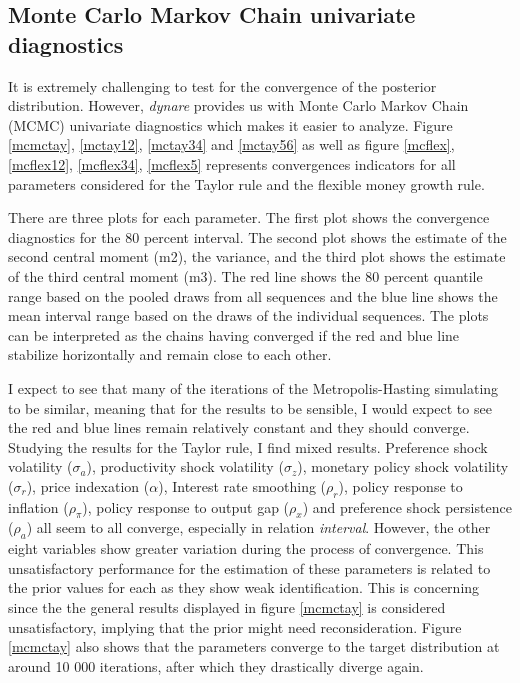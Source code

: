 \documentclass[11pt,preprint, authoryear]{elsarticle}
\numberwithin{equation}{section}
\numberwithin{figure}{section}
\numberwithin{table}{section}
\begin{document}
\hypertarget{monte-carlo-markov-chain-univariate-diagnostics}{%
\subsection{Monte Carlo Markov Chain univariate
diagnostics}\label{monte-carlo-markov-chain-univariate-diagnostics}}

It is extremely challenging to test for the convergence of the posterior
distribution. However, \emph{dynare} provides us with Monte Carlo Markov
Chain (MCMC) univariate diagnostics which makes it easier to analyze.
Figure \ref{mcmctay}, \ref{mctay12}, \ref{mctay34} and \ref{mctay56} as
well as figure \ref{mcflex}, \ref{mcflex12}, \ref{mcflex34},
\ref{mcflex5} represents convergences indicators for all parameters
considered for the Taylor rule and the flexible money growth rule.

There are three plots for each parameter. The first plot shows the
convergence diagnostics for the 80 percent interval. The second plot
shows the estimate of the second central moment (m2), the variance, and
the third plot shows the estimate of the third central moment (m3). The
red line shows the 80 percent quantile range based on the pooled draws
from all sequences and the blue line shows the mean interval range based
on the draws of the individual sequences. The plots can be interpreted
as the chains having converged if the red and blue line stabilize
horizontally and remain close to each other.

I expect to see that many of the iterations of the Metropolis-Hasting
simulating to be similar, meaning that for the results to be sensible, I
would expect to see the red and blue lines remain relatively constant
and they should converge. Studying the results for the Taylor rule, I
find mixed results. Preference shock volatility (\(\sigma_a\)),
productivity shock volatility (\(\sigma_z\)), monetary policy shock
volatility (\(\sigma_r\)), price indexation (\(\alpha\)), Interest rate
smoothing (\(\rho_r\)), policy response to inflation (\(\rho_\pi\)),
policy response to output gap (\(\rho_x\)) and preference shock
persistence (\(\rho_a\)) all seem to all converge, especially in
relation \emph{interval}. However, the other eight variables show
greater variation during the process of convergence. This unsatisfactory
performance for the estimation of these parameters is related to the
prior values for each as they show weak identification. This is
concerning since the the general results displayed in figure
\ref{mcmctay} is considered unsatisfactory, implying that the prior
might need reconsideration. Figure \ref{mcmctay} also shows that the
parameters converge to the target distribution at around 10 000
iterations, after which they drastically diverge again.
\end{document}
